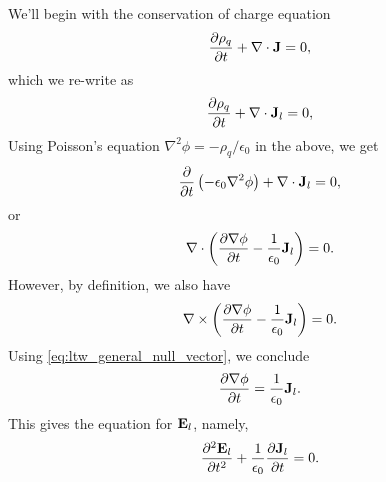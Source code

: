 \documentclass[a4paper,11pt]{report}
\begin{document}
We'll begin with the conservation of charge equation
\begin{equation*}
    \frac{\partial \rho_q}{\partial t} + \nabla \cdot \mathbf{J} = 0,
\end{equation*}
which we re-write as
\begin{equation*}
    \frac{\partial \rho_q}{\partial t} + \nabla \cdot \mathbf{J}_l = 0,
\end{equation*}
Using Poisson's equation $\nabla^2\phi = -\rho_q / \epsilon_0$ in the above, we get
\begin{equation*}
    \frac{\partial}{\partial t} \left ( -\epsilon_0 \nabla^2 \phi \right ) + \nabla \cdot \mathbf{J}_l = 0,
\end{equation*}
or
\begin{equation*}
    \nabla \cdot \left ( \frac{\partial \nabla \phi}{\partial t} - \frac{1}{\epsilon_0} \mathbf{J}_l \right ) = 0.
\end{equation*}
However, by definition, we also have
\begin{equation*}
    \nabla \times \left ( \frac{\partial \nabla \phi}{\partial t} - \frac{1}{\epsilon_0} \mathbf{J}_l \right ) = 0.
\end{equation*}
Using \cref{eq:ltw_general_null_vector}, we conclude
\begin{equation}
    \label{eq:emp_general_longitudinal_J}
    \frac{\partial \nabla \phi}{\partial t} = \frac{1}{\epsilon_0} \mathbf{J}_l.
\end{equation}
This gives the equation for $\mathbf{E}_l$, namely,
\begin{equation}
    \label{eq:emp_general_long_E}
    \frac{\partial^2 \mathbf{E}_l}{\partial t^2} + \frac{1}{\epsilon_0} \frac{\partial \mathbf{J}_l}{\partial t} = 0.
\end{equation}
\end{document}
